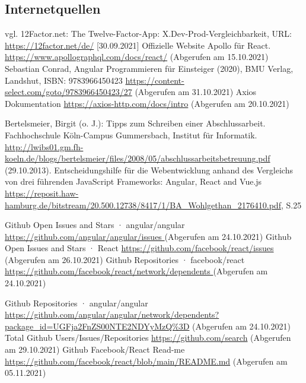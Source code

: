 \subsection{Internetquellen}
\begin{thebibliography}{HR08} %

 vgl. 12Factor.net: The Twelve-Factor-App: X.Dev-Prod-Vergleichbarkeit, URL: \url{https://12factor.net/de/} [30.09.2021]
Offizielle Website Apollo für React. \url{https://www.apollographql.com/docs/react/} (Abgerufen am 15.10.2021)
 Sebastian Conrad, Angular Programmieren für Einsteiger (2020), BMU Verlag, Landshut, ISBN: 9783966450423 \url{https://content-select.com/goto/9783966450423/27} (Abgerufen am 31.10.2021)
Axios Dokumentation \url{https://axios-http.com/docs/intro} (Abgerufen am 20.10.2021)

Bertelsmeier, Birgit (o. J.): Tipps zum Schrei\-b\-en ei\-n\-er Ab\-sch\-luss\-ar\-beit. Fach\-hoch\-schu\-le Köln-Campus Gummersbach, Institut für Informatik. \url{http://lwibs01.gm.fh-koeln.de/blogs/bertelsmeier/files/2008/05/abschlussarbeitsbetreuung.pdf} (29.10.2013).
Entscheidungshilfe für die Webentwicklung anhand des Vergleichs von drei führenden JavaScript Frameworks: Angular, React and Vue.js \url{https://reposit.haw-hamburg.de/bitstream/20.500.12738/8417/1/BA_Wohlgethan_2176410.pdf}, S.25


Github Open Issues and Stars · angular/angular \url{ https://github.com/angular/angular/issues }  (Abgerufen am 24.10.2021)
 Github Open Issues and Stars · React \url{https://github.com/facebook/react/issues} (Abgerufen am 26.10.2021)
 Github Repositories · facebook/react \url{ https://github.com/facebook/react/network/dependents } (Abgerufen am 24.10.2021)

 Github Repositories · angular/angular \url{https://github.com/angular/angular/network/dependents?package_id=UGFja2FnZS00NTE2NDYyMzQ%3D}  (Abgerufen am 24.10.2021)
 Total Github Users/Issues/Repositories \url{ https://github.com/search}  (Abgerufen am 29.10.2021)
 Github Facebook/React Read-me \url{ https://github.com/facebook/react/blob/main/README.md}  (Abgerufen am 05.11.2021)


\end{thebibliography}
